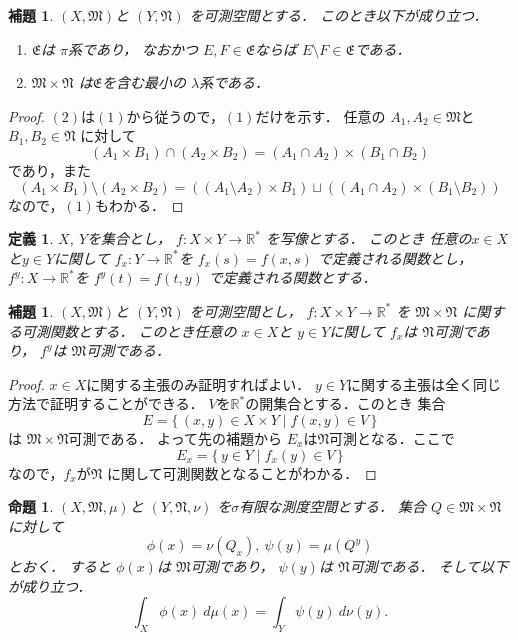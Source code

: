 \documentclass[leqno, a4paper, 12pt]{jsarticle}
\newtheorem{prop}[thm]{命題}
\newtheorem{lem}[thm]{補題}
\newtheorem{df}[thm]{定義}
\newcommand{\rr}{\mathbb{R}}
\begin{document}
\begin{lem}\label{lem:timesfam}
$(X, \mathfrak{M})$と
$(Y, \mathfrak{N})$
を可測空間とする．
このとき以下が成り立つ．
\begin{enumerate}
\item 
$\mathfrak{E}$は
$\pi$系であり，
なおかつ
$E, F\in \mathfrak{E}$ならば
$E\setminus F\in \mathfrak{E}$である．
\item 
$\mathfrak{M}\times \mathfrak{N}$
は$\mathfrak{E}$を含む最小の
$\lambda$系である．
\end{enumerate}
\end{lem}
\begin{proof}
$(2)$は$(1)$から従うので，$(1)$だけを示す．
任意の
$A_{1}, A_{2}\in \mathfrak{M}$と
$B_{1}, B_{2}\in \mathfrak{N}$
に対して
\[
(A_{1}\times B_{1})\cap (A_{2}\times B_{2})
=(A_{1}\cap A_{2})\times (B_{1}\cap B_{2})
\]
であり，また
\[
(A_{1}\times B_{1})\setminus  (A_{2}\times B_{2})
=((A_{1}\setminus A_{2})\times B_{1})
\sqcup 
((A_{1}\cap A_{2})\times (B_{1}\setminus B_{2}))
\]
なので，$(1)$もわかる．
\end{proof}


\begin{df}
$X$, $Y$を集合とし，
$f: X\times Y\to \rr^{*}$
を写像とする．
このとき
任意の$x\in X$と$y\in Y$に関して
$f_{x}: Y\to \rr^{*}$を
$f_{x}(s)=f(x, s)$
で定義される関数とし，
$f^{y}: X\to \rr^{*}$を
$f^{y}(t)=f(t, y)$
で定義される関数とする．
\end{df}

\begin{lem}\label{lem:mapslice}
$(X, \mathfrak{M})$と
$(Y, \mathfrak{N})$
を可測空間とし，
$f: X\times Y\to \rr^{*}$
を
$\mathfrak{M}\times \mathfrak{N}$
に関する可測関数とする．
このとき任意の
$x\in X$と
$y\in Y$に関して
$f_{x}$は
$\mathfrak{N}$可測であり，
$f^{y}$は
$\mathfrak{M}$可測である．
\end{lem}
\begin{proof}
$x\in X$に関する主張のみ証明すればよい．
$y\in Y$に関する主張は全く同じ方法で証明することができる．
$V$を$\rr^{*}$の開集合とする．このとき
集合
\[
E=\{\, (x, y)\in X\times Y\mid f(x, y)\in V\, \}
\]
は
$\mathfrak{M}\times \mathfrak{N}$可測である．
よって先の補題から
$E_{x}$は$\mathfrak{N}$可測となる．ここで
\[
E_{x}=\{\, y\in Y\mid f_{x}(y)\in V\, \}
\]
なので，$f_{x}$が$\mathfrak{N}$
に関して可測関数となることがわかる．
\end{proof}

\begin{prop}\label{prop:sliceint}
$(X, \mathfrak{M}, \mu)$と
$(Y, \mathfrak{N}, \nu)$
を$\sigma$有限な測度空間とする．
集合
$Q\in \mathfrak{M}\times \mathfrak{N}$
に対して
\[
\phi(x)=\nu(Q_{x}), \ \psi(y)=\mu(Q^{y})
\]
とおく．
すると
$\phi(x)$は
$\mathfrak{M}$可測であり，
$\psi(y)$は
$\mathfrak{N}$可測である．
そして以下が成り立つ．
\[
\int_{X}\phi(x)\ d\mu(x)=\int_{Y}\psi(y)\ d\nu(y). 
\]

\end{prop}
\end{document}
